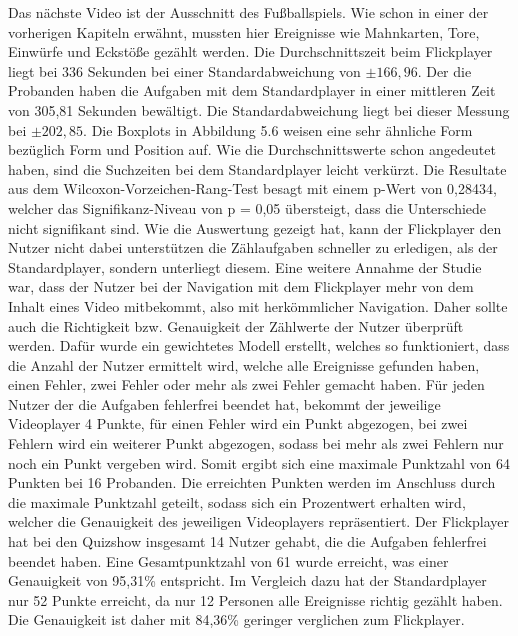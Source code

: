 \documentclass[11pt,a4paper]{report}
\begin{document}
Das nächste Video ist der Ausschnitt des Fußballspiels. Wie schon in einer der vorherigen Kapiteln erwähnt, mussten hier Ereignisse wie Mahnkarten, Tore, Einwürfe und Eckstöße gezählt werden. Die Durchschnittszeit beim Flickplayer liegt bei 336 Sekunden bei einer Standardabweichung von  $\pm 166,96$. Der die Probanden haben die Aufgaben mit dem Standardplayer in einer mittleren Zeit von 305,81 Sekunden bewältigt. Die Standardabweichung liegt bei dieser Messung bei  $\pm 202,85$. Die Boxplots in Abbildung 5.6 weisen eine sehr ähnliche Form bezüglich Form und Position auf. Wie die Durchschnittswerte schon angedeutet haben, sind die Suchzeiten bei dem Standardplayer leicht verkürzt. Die Resultate aus dem Wilcoxon-Vorzeichen-Rang-Test besagt mit einem p-Wert von 0,28434, welcher das Signifikanz-Niveau von p = 0,05 übersteigt, dass die Unterschiede nicht signifikant sind. Wie die Auswertung gezeigt hat, kann der Flickplayer den Nutzer nicht dabei unterstützen die Zählaufgaben schneller zu erledigen, als der Standardplayer, sondern unterliegt diesem. Eine weitere Annahme der Studie war, dass der Nutzer bei der Navigation mit dem Flickplayer mehr von dem Inhalt eines Video mitbekommt, also mit herkömmlicher Navigation. Daher sollte auch die Richtigkeit bzw. Genauigkeit der Zählwerte der Nutzer überprüft werden. Dafür wurde ein gewichtetes Modell erstellt, welches so funktioniert, dass die Anzahl der Nutzer ermittelt wird, welche alle Ereignisse gefunden haben, einen Fehler, zwei Fehler oder mehr als zwei Fehler gemacht haben. Für jeden Nutzer der die Aufgaben fehlerfrei beendet hat, bekommt der jeweilige Videoplayer 4 Punkte, für einen Fehler wird ein Punkt abgezogen, bei zwei Fehlern wird ein weiterer Punkt abgezogen, sodass bei mehr als zwei Fehlern nur noch ein Punkt vergeben wird. Somit ergibt sich eine maximale Punktzahl von 64 Punkten bei 16 Probanden. Die erreichten Punkten werden im Anschluss durch die maximale Punktzahl geteilt, sodass sich ein Prozentwert erhalten wird, welcher die Genauigkeit des jeweiligen Videoplayers repräsentiert. Der Flickplayer hat bei den Quizshow insgesamt 14 Nutzer gehabt, die die Aufgaben fehlerfrei beendet haben. Eine Gesamtpunktzahl von 61 wurde erreicht, was einer Genauigkeit von 95,31\% entspricht. Im Vergleich dazu hat der Standardplayer nur 52 Punkte erreicht, da nur 12 Personen alle Ereignisse richtig gezählt haben. Die Genauigkeit ist daher mit 84,36\% geringer verglichen zum Flickplayer.
\end{document}
